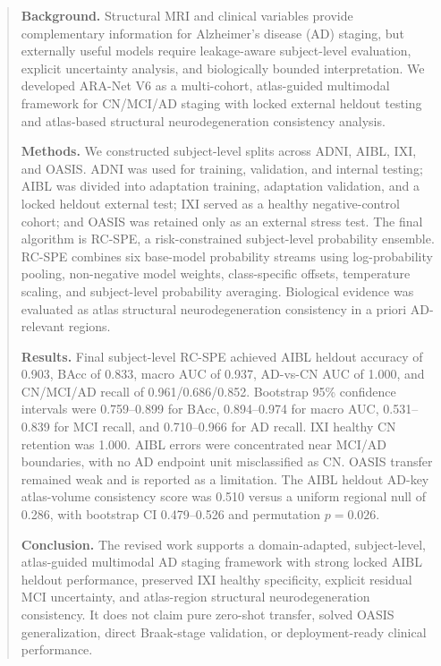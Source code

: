 \documentclass[12pt,a4paper]{article}
\begin{document}
\date{}
\maketitle
\begin{abstract}

\textbf{Background.}
Structural MRI and clinical variables provide complementary information for Alzheimer's disease (AD) staging, but externally useful models require leakage-aware subject-level evaluation, explicit uncertainty analysis, and biologically bounded interpretation. We developed ARA-Net V6 as a multi-cohort, atlas-guided multimodal framework for CN/MCI/AD staging with locked external heldout testing and atlas-based structural neurodegeneration consistency analysis.

\textbf{Methods.}
We constructed subject-level splits across ADNI, AIBL, IXI, and OASIS. ADNI was used for training, validation, and internal testing; AIBL was divided into adaptation training, adaptation validation, and a locked heldout external test; IXI served as a healthy negative-control cohort; and OASIS was retained only as an external stress test. The final algorithm is RC-SPE, a risk-constrained subject-level probability ensemble. RC-SPE combines six base-model probability streams using log-probability pooling, non-negative model weights, class-specific offsets, temperature scaling, and subject-level probability averaging. Biological evidence was evaluated as atlas structural neurodegeneration consistency in a priori AD-relevant regions.

\textbf{Results.}
Final subject-level RC-SPE achieved AIBL heldout accuracy of 0.903, BAcc of 0.833, macro AUC of 0.937, AD-vs-CN AUC of 1.000, and CN/MCI/AD recall of 0.961/0.686/0.852. Bootstrap 95\% confidence intervals were 0.759--0.899 for BAcc, 0.894--0.974 for macro AUC, 0.531--0.839 for MCI recall, and 0.710--0.966 for AD recall. IXI healthy CN retention was 1.000. AIBL errors were concentrated near MCI/AD boundaries, with no AD endpoint unit misclassified as CN. OASIS transfer remained weak and is reported as a limitation. The AIBL heldout AD-key atlas-volume consistency score was 0.510 versus a uniform regional null of 0.286, with bootstrap CI 0.479--0.526 and permutation $p=0.026$.

\textbf{Conclusion.}
The revised work supports a domain-adapted, subject-level, atlas-guided multimodal AD staging framework with strong locked AIBL heldout performance, preserved IXI healthy specificity, explicit residual MCI uncertainty, and atlas-region structural neurodegeneration consistency. It does not claim pure zero-shot transfer, solved OASIS generalization, direct Braak-stage validation, or deployment-ready clinical performance.

\end{abstract}
\end{document}
